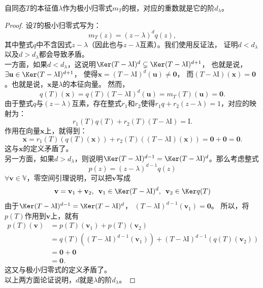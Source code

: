 \documentclass[12pt,UTF8]{ctexbook}
\begin{document}
\begin{pp}\label{pp:6_12_5}
    自同态$T$的本征值$\lambda$作为极小归零式$m_T$的根，对应的重数就是它的阶$d_\lambda$。
\end{pp}
\begin{proof} %
设$T$的极小归零式写为：
$$ m_T(z) = (z - \lambda)^d q(z),$$
其中整式$q$中不含因式$z - \lambda$（因此也与$z - \lambda$互素）。我们使用反证法，
证明$d < d_{\lambda}$以及$d > d_{\lambda}$都会导致矛盾。\\
一方面，如果$d < d_{\lambda}$，这说明$\Ker (T - \lambda\mathrm{I})^{d} \subsetneq \Ker (T - \lambda\mathrm{I})^{d+1}$，
也就是说，$\exists \mathbf{u}\in \Ker (T - \lambda\mathrm{I})^{d+1}$，
使得$\mathbf{x} = (T - \lambda\mathrm{I})^{d}(\mathbf{u}) \neq \mathbf{0}$，
而$(T - \lambda\mathrm{I})(\mathbf{x}) = \mathbf{0}$。也就是说，$\mathbf{x}$是$\lambda$的本征向量。
然而，
$$q(T)(\mathbf{x}) = q(T)(T - \lambda\mathrm{I})^{d}(\mathbf{u}) = m_T(T)(\mathbf{u}) = \mathbf{0}.$$ 
由于整式$q$与$(z - \lambda)$互素，存在整式$r_1$和$r_2$使得$r_1 q + r_2 (z - \lambda) = 1$，对应的映射为：
$$ r_1(T) q(T) + r_2(T) (T - \lambda \mathrm{I}) = \mathrm{I}. $$
作用在向量$\mathbf{x}$上，就得到：
$$ \mathbf{x} = r_1(T) (q(T)(\mathbf{x})) + r_2(T)((T - \lambda \mathrm{I})(\mathbf{x})) = \mathbf{0} + \mathbf{0} = \mathbf{0}. $$
这与$\mathbf{x}$的定义矛盾了。 \\
另一方面，如果$d > d_{\lambda}$，则说明$\Ker (T - \lambda\mathrm{I})^{d - 1} = \Ker (T - \lambda\mathrm{I})^{d}$。那么考虑整式
$$p(z) = (z - \lambda)^{d-1} q(z)$$
$\forall \mathbf{v} \in \mathbb{V}$，零空间引理说明，可以把$\mathbf{v}$写成
$$\mathbf{v} = \mathbf{v}_1 + \mathbf{v}_2, \,\,\, \mathbf{v}_1 \in \Ker (T - \lambda\mathrm{I})^{d}, \,\,\, \mathbf{v}_2 \in \Ker q(T) $$
由于$\Ker (T - \lambda\mathrm{I})^{d- 1} = \Ker (T - \lambda\mathrm{I})^{d}$，
$(T - \lambda\mathrm{I})^{d- 1}(\mathbf{v}_1) = \mathbf{0}$。
所以，将$p(T)$作用到$\mathbf{v}$上，就有
\begin{align*} 
    p(T)(\mathbf{v}) &= p(T)(\mathbf{v}_1) + p(T)(\mathbf{v}_2)  \\
    &= q(T)((T - \lambda\mathrm{I})^{d- 1}(\mathbf{v}_1)) + (T - \lambda\mathrm{I})^{d- 1}(q(T)(\mathbf{v}_2))  \\
    &= \mathbf{0} + \mathbf{0}  \\
    &= \mathbf{0}. 
\end{align*}
这又与极小归零式的定义矛盾了。\\
以上两方面论证说明，$d$就是$\lambda$的阶$d_{\lambda}$。

\end{proof}
\end{document}
